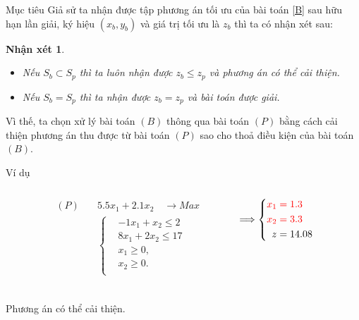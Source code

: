 \documentclass{beamer}
\newtheorem{nx}{Nhận xét}[section]
\begin{document}
\begin{frame}{Mục tiêu} %
Giả sử ta nhận được tập phương án tối ưu của bài toán \eqref{B} sau hữu hạn lần giải, ký hiệu $(x_b, y_b)$ và giá trị tối ưu là $z_b$ thì ta có nhận xét sau:
\begin{nx} \label{nx}
\begin{itemize}
\item Nếu $S_b \subset S_p$ thì ta luôn nhận được $z_b \leq z_p$ và phương án có thể cải thiện.
\item Nếu $S_b = S_p$ thì ta nhận được $z_b = z_p$ và bài toán được giải.
\end{itemize}    
\end{nx}
Vì thế, ta chọn xử lý bài toán $(B)$ thông qua bài toán $(P)$ bằng cách cải thiện phương án thu được từ bài toán $(P)$ sao cho thoả điều kiện của bài toán $(B)$.
\end{frame}

\begin{frame}{Ví dụ}
    \begin{columns}
    \begin{column}{0.1\textwidth}
    \end{column}
    \begin{column}{0.4\textwidth}
        \begin{equation*}
        \begin{split}
            (P) \quad & 5.5x_1 + 2.1x_2 \quad \longrightarrow Max \\
            & \left\{\begin{split}
            & -1x_1 + x_2 \leq 2 \\
            & 8x_1 + 2x_2 \leq 17 \\
            &x_1 \geq 0, \\
            &x_2 \geq 0. \\
            \end{split}\right. \\
        \end{split}
        \end{equation*}
    \end{column}
    \begin{column}{0.4\textwidth}
        \begin{equation*}
            \Longrightarrow
            \left\{\begin{split}
            \color{red} x_1 &\color{red} = 1.3 \\
            \color{red} x_2 &\color{red} = 3.3 \\
            z&=14.08
        \end{split}\right.
        \end{equation*}
    \end{column}
    \begin{column}{0.1\textwidth}
    \end{column}
    \end{columns}
    \vspace{1cm}
    \center
    \Large
    Phương án có thể cải thiện.
\end{frame}
\end{document}
